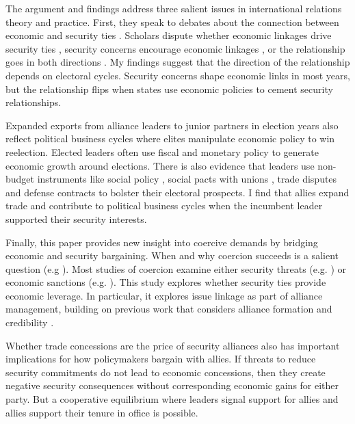 \documentclass[12pt]{article}
\begin{document}
The argument and findings address three salient issues in international relations theory and practice. 
First, they speak to debates about the connection between economic and security ties \citep{Mastanduno2009, Poast2019}. 
Scholars dispute whether economic linkages drive security ties \citep{BiglaiserDeRouen2007, Fordham2010, Kimball2010}, security concerns encourage economic linkages \citep{Gowa1995, Li2003, LongLeeds2006, GowaMansfield2004}, or the relationship goes in both directions \citep{BiglaiserDeRouen2009, KinneBunte2018}. 
My findings suggest that the direction of the relationship depends on electoral cycles. 
Security concerns shape economic links in most years, but the relationship flips when states use economic policies to cement security relationships.


Expanded exports from alliance leaders to junior partners in election years also reflect political business cycles where elites manipulate economic policy to win reelection. 
Elected leaders often use fiscal \citep{Rogoff1987} and monetary policy \citep{ClarkHallerberg2000} to generate economic growth around elections. 
There is also evidence that leaders use non-budget instruments like social policy \citep{Philips2020}, social pacts with unions \citep{Ahlquist2010}, trade disputes \citep{Conconietal2017} and defense contracts \citep{DerouenHeo2000} to bolster their electoral prospects. 
I find that allies expand trade and contribute to political business cycles when the incumbent leader supported their security interests.


Finally, this paper provides new insight into coercive demands by bridging economic and security bargaining.
When and why coercion succeeds is a salient question (e.g \citep{Sechser2010, Sechser2018, Cebuletal2021}).  
Most studies of coercion examine either security threats (e.g. \citep{HorowitzReiter2001, Sechser2011}) or economic sanctions (e.g. \citep{Marinov2005, Allen2008, Escriba-FolchWright2010}).
This study explores whether security ties provide economic leverage. 
In particular, it explores issue linkage as part of alliance management, building on previous work that considers alliance formation \citep{Poast2012} and credibility \citep{Davis2008, Poast2013}. 


Whether trade concessions are the price of security alliances also has important implications for how policymakers bargain with allies. 
If threats to reduce security commitments do not lead to economic concessions, then they create negative security consequences without corresponding economic gains for either party. 
But a cooperative equilibrium where leaders signal support for allies and allies support their tenure in office is possible. 
\end{document}
